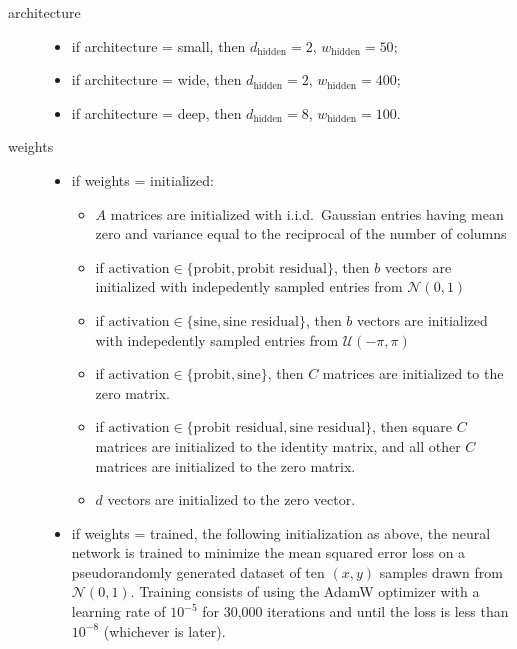 \documentclass{article}
\begin{document}
\begin{description}
  \item[architecture] 
  \begin{itemize}
    \item if architecture = small, then \(d_\mathrm{hidden} = 2\), \(w_\mathrm{hidden} = 50\);
    \item if architecture = wide, then \(d_\mathrm{hidden} = 2\), \(w_\mathrm{hidden} = 400\);
    \item if architecture = deep, then \(d_\mathrm{hidden} = 8\), \(w_\mathrm{hidden} = 100\).
  \end{itemize}
  \item[weights]
  \begin{itemize}
    \item if weights = initialized:
    \begin{itemize}
      \item \(A\) matrices are initialized with i.i.d.~Gaussian entries having mean zero and variance equal to the reciprocal of the number of columns
      \item if \(\text{activation} \in \{\text{probit}, \text{probit residual}\}\), then \(b\) vectors are initialized with indepedently sampled entries from \(\mathcal N(0, 1)\)
      \item if \(\text{activation} \in \{\text{sine}, \text{sine residual}\}\), then \(b\) vectors are initialized with indepedently sampled entries from \(\mathcal U(-\pi, \pi)\)
      \item if \(\text{activation} \in \{\text{probit}, \text{sine}\}\), then \(C\) matrices are initialized to the zero matrix.
      \item if \(\text{activation} \in \{\text{probit residual}, \text{sine residual}\}\), then square \(C\) matrices are initialized to the identity matrix, and all other \(C\) matrices are initialized to the zero matrix.
      \item \(d\) vectors are initialized to the zero vector.
    \end{itemize}
    \item if weights = trained, the following initialization as above, the neural network is trained to minimize the mean squared error loss on a pseudorandomly generated dataset of ten \((x, y)\) samples drawn from \(\mathcal N(0, 1)\).
    Training consists of using the AdamW optimizer \citep{loshchilov_decoupled_2019} with a learning rate of \(10^{-5}\) for 30,000 iterations and until the loss is less than \(10^{-8}\) (whichever is later).

\end{itemize}
\end{description}
\end{document}
